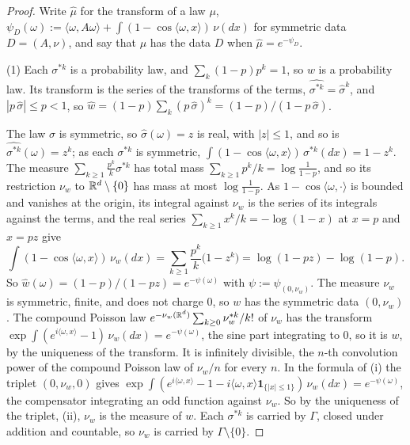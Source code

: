 \begin{proof}
\leanok
{}
Write $\widehat{\mu}$ for the transform of a law $\mu$, $\psi_D(\omega) := \langle\omega,
A\omega\rangle + \int(1 - \cos\langle\omega, x\rangle)\,\nu(dx)$ for symmetric data $D = (A, \nu)$,
and say that $\mu$ has the data $D$ when $\widehat{\mu} = e^{-\psi_D}$.

(1) Each $\sigma^{*k}$ is a probability law, and $\sum_k(1-p)p^k = 1$, so $w$ is a probability law.
Its transform is the series of the transforms of the terms, $\widehat{\sigma^{*k}} =
\widehat{\sigma}^k$, and $|p\,\widehat{\sigma}| \le p < 1$, so
$\widehat{w} = (1-p)\sum_k(p\,\widehat{\sigma})^k = (1-p)/(1 - p\,\widehat{\sigma})$.

The law $\sigma$ is symmetric, so $\widehat{\sigma}(\omega) = z$ is real, with $|z| \le 1$, and so
is $\widehat{\sigma^{*k}}(\omega) = z^k$; as each $\sigma^{*k}$ is symmetric,
$\int(1 - \cos\langle\omega, x\rangle)\,\sigma^{*k}(dx) = 1 - z^k$. The measure
$\sum_{k \ge 1}\tfrac{p^k}{k}\sigma^{*k}$ has total mass $\sum_{k \ge 1}p^k/k = \log\frac{1}{1-p}$,
and so its restriction $\nu_w$ to $\mathbb{R}^d \setminus \{0\}$ has mass at most $\log\frac{1}{1-p}$. As
$1 - \cos\langle\omega, \cdot\rangle$ is bounded and vanishes at the origin, its integral against
$\nu_w$ is the series of its integrals against the terms, and the real series
$\sum_{k \ge 1}x^k/k = -\log(1 - x)$ at $x = p$ and $x = pz$ give
\[
\int(1 - \cos\langle\omega, x\rangle)\,\nu_w(dx) = \sum_{k \ge 1}\frac{p^k}{k}\bigl(1 - z^k\bigr)
= \log(1 - pz) - \log(1 - p) .
\]
So $\widehat{w}(\omega) = (1-p)/(1-pz) = e^{-\psi(\omega)}$ with $\psi := \psi_{(0, \nu_w)}$. The
measure $\nu_w$ is symmetric, finite, and does not charge $0$, so $w$ has the symmetric data
$(0, \nu_w)$. The compound Poisson law $e^{-\nu_w(\mathbb{R}^d)}\sum_{k \ge 0}\nu_w^{*k}/k!$ of $\nu_w$ has
the transform $\exp\int(e^{i\langle\omega, x\rangle} - 1)\,\nu_w(dx) = e^{-\psi(\omega)}$, the sine
part integrating to $0$, so it is $w$, by the uniqueness of the transform. It is infinitely
divisible, the $n$-th convolution power of the compound Poisson law of $\nu_w/n$ for every $n$. In
the formula of (i) the triplet $(0, \nu_w, 0)$ gives
$\exp\int(e^{i\langle\omega, x\rangle} - 1 - i\langle\omega, x\rangle\mathbf 1_{\{|x| \le 1\}})\,
\nu_w(dx) = e^{-\psi(\omega)}$, the compensator integrating an odd function against $\nu_w$. So by
the uniqueness of the triplet, (ii), $\nu_w$ is the \Levy{} measure of $w$. Each
$\sigma^{*k}$ is carried by $\Gamma$, closed under addition and countable, so $\nu_w$ is carried by
$\Gamma \setminus \{0\}$.


\end{proof}
